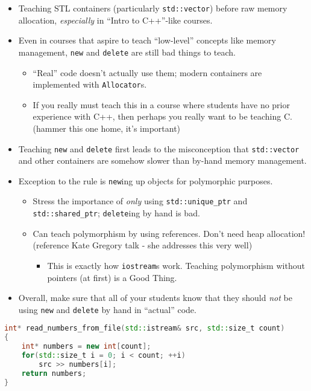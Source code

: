 \documentclass{article}
\newcommand{\uniqueptr}{\texttt{std::unique\_ptr}}
\newcommand{\sharedptr}{\texttt{std::shared\_ptr}}
\newcommand{\CppNew}{\texttt{new}}
\newcommand{\CppDelete}{\texttt{delete}}
\newcommand{\placeholdertext}[1]{
	\noindent{\color{red}{#1}}
}
\begin{document}
\placeholdertext{Address the following:}
\begin{itemize}
	\item Teaching STL containers (particularly \texttt{std::vector}) before raw memory allocation, \emph{especially} in ``Intro to C++''-like courses.
	\item Even in courses that aspire to teach ``low-level'' concepts like memory management, \CppNew{} and \CppDelete{} are still bad things to teach.
	\begin{itemize}
		\item ``Real'' code doesn't actually use them; modern containers are implemented with \texttt{Allocator}s.
		\item If you really must teach this in a course where students have no prior experience with C++, then perhaps you really want to be teaching C.  (hammer this one home, it's important)
	\end{itemize}
	\item Teaching \CppNew{} and \CppDelete{} first leads to the misconception that \texttt{std::vector} and other containers are somehow slower than by-hand memory management.
	\item Exception to the rule is \CppNew{}ing up objects for polymorphic purposes. 
	\begin{itemize}
		\item Stress the importance of \emph{only} using \uniqueptr{} and \sharedptr{}; \CppDelete{}ing by hand is bad.
		\item Can teach polymorphism by using references. Don't need heap allocation! (reference Kate Gregory talk - she addresses this very well)
		\begin{itemize}
			\item This is exactly how \texttt{iostream}s work.  Teaching polymorphism without pointers (at first) is a \textsf{Good Thing}\texttrademark{}.
		\end{itemize}
	\end{itemize}
	\item Overall, make sure that all of your students know that they should \emph{not} be using \CppNew{} and \CppDelete{} by hand in ``actual'' code.
\end{itemize}


\placeholdertext{Need a better code sample.}
\begin{lstlisting}[language=C++]
int* read_numbers_from_file(std::istream& src, std::size_t count)
{
	int* numbers = new int[count];
	for(std::size_t i = 0; i < count; ++i)
		src >> numbers[i];
	return numbers;
}
\end{lstlisting}
\end{document}
